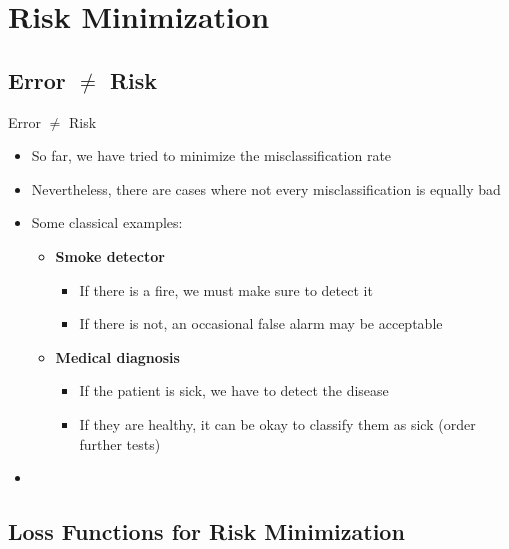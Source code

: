 \section{Risk Minimization}

\subsection{Error $\ne$ Risk}

\begin{frame}{Error $\ne$ Risk}{}
	\begin{itemize}
		\item So far, we have tried to minimize the misclassification rate
		\item Nevertheless, there are cases where not every misclassification is equally bad
		\item Some classical examples:
		\begin{itemize}
			\item \textbf{Smoke detector}
			\begin{itemize}
				\item If there is a fire, we must make sure to detect it
				\item If there is not, an occasional false alarm may be acceptable
			\end{itemize}
			\item \textbf{Medical diagnosis}
			\begin{itemize}
				\item If the patient is sick, we have to detect the disease
				\item If they are healthy, it can be okay to classify them as sick (order further tests)
			\end{itemize}
		\end{itemize}
		\item {}
	\end{itemize}
\end{frame}


\subsection{Loss Functions for Risk Minimization}

